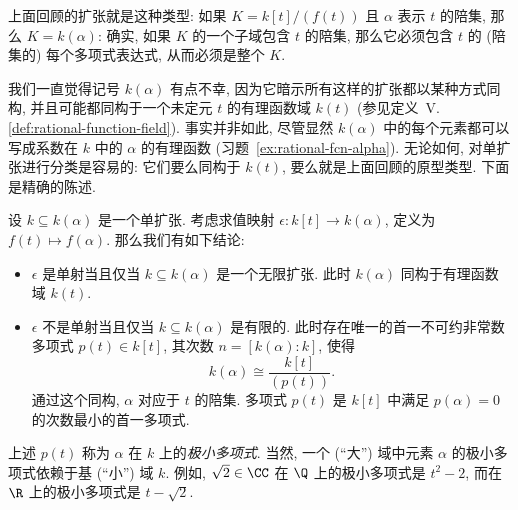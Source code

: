上面回顾的扩张就是这种类型: 如果 $K=k[t]/(f(t))$ 且 $\alpha$ 表示 $t$ 的陪集, 那么 $K=k(\alpha)$: 确实, 如果 $K$ 的一个子域包含 $t$ 的陪集, 那么它必须包含 $t$ 的 (陪集的) 每个多项式表达式, 从而必须是整个 $K$.

我们一直觉得记号 $k(\alpha)$ 有点不幸, 因为它暗示所有这样的扩张都以某种方式同构, 并且可能都同构于一个未定元 $t$ 的有理函数域 $k(t)$ (参见定义~V.\ref{def:rational-function-field}). 事实并非如此, 尽管显然 $k(\alpha)$ 中的每个元素都可以写成系数在 $k$ 中的 $\alpha$ 的有理函数 (习题~\ref{ex:rational-fcn-alpha}). 无论如何, 对单扩张进行分类是容易的: 它们要么同构于 $k(t)$, 要么就是上面回顾的原型类型. 下面是精确的陈述.

\begin{proposition}\label{prop:simple-extension-classification}
设 $k\subseteq k(\alpha)$ 是一个单扩张. 考虑求值映射 $\epsilon:k[t]\to k(\alpha)$, 定义为 $f(t)\mapsto f(\alpha)$. 那么我们有如下结论:

\begin{itemize}
\item $\epsilon$ 是单射当且仅当 $k\subseteq k(\alpha)$ 是一个无限扩张. 此时 $k(\alpha)$ 同构于有理函数域 $k(t)$.
\item $\epsilon$ 不是单射当且仅当 $k\subseteq k(\alpha)$ 是有限的. 此时存在唯一的首一不可约非常数多项式 $p(t)\in k[t]$, 其次数 $n=[k(\alpha):k]$, 使得
\[
k(\alpha)\cong\frac{k[t]}{(p(t))}.
\]
通过这个同构, $\alpha$ 对应于 $t$ 的陪集. 多项式 $p(t)$ 是 $k[t]$ 中满足 $p(\alpha)=0$ 的次数最小的首一多项式.
\end{itemize}
\end{proposition}

上述 $p(t)$ 称为 $\alpha$ 在 $k$ 上的\emph{极小多项式}. 当然, 一个 (``大'') 域中元素 $\alpha$ 的极小多项式依赖于基 (``小'') 域 $k$. 例如, $\sqrt{2}\in\CC$ 在 $\Q$ 上的极小多项式是 $t^2-2$, 而在 $\R$ 上的极小多项式是 $t-\sqrt{2}$.

